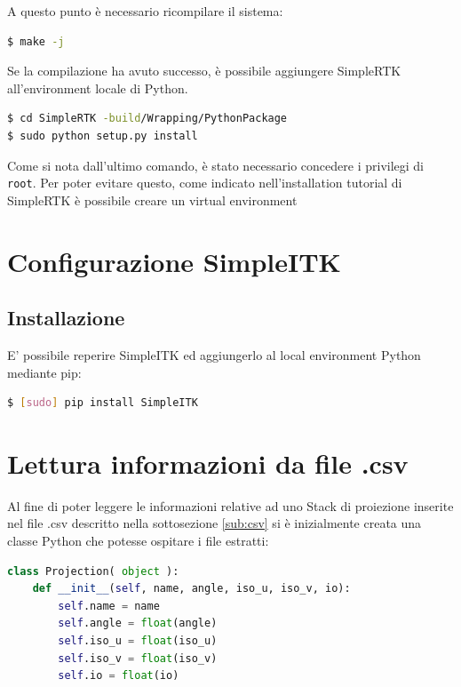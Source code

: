 \documentclass[a4paper,11pt, oneside]{article}
\begin{document}
                    A questo punto è necessario ricompilare il sistema:
                    \begin{lstlisting}[language=bash, frame=bt]
$ make -j
                    \end{lstlisting}
                    
                    Se la compilazione ha avuto successo, è possibile aggiungere SimpleRTK all'environment locale di Python.
                    \begin{lstlisting}[language=bash, frame=bt]
$ cd SimpleRTK -build/Wrapping/PythonPackage
$ sudo python setup.py install
                    \end{lstlisting}
                    Come si nota dall'ultimo comando, è stato necessario concedere i privilegi di \texttt{root}. Per poter evitare questo, come indicato nell'installation tutorial di SimpleRTK è possibile creare un virtual environment\cite{simplertk-wiki}
               
        \section{Configurazione SimpleITK}
            \subsection{Installazione}
                E' possibile reperire SimpleITK ed aggiungerlo al local environment Python mediante pip:
                \begin{lstlisting}[language=bash, frame=bt]
$ [sudo] pip install SimpleITK
                    \end{lstlisting}
            
        
        \section{Lettura informazioni da file .csv}
            Al fine di poter leggere le informazioni relative ad uno Stack di proiezione inserite nel file .csv descritto nella sottosezione \ref{sub:csv} si è inizialmente creata una classe Python che potesse ospitare i file estratti:
            
            \begin{lstlisting}[language=python, frame=bt]
class Projection( object ):
    def __init__(self, name, angle, iso_u, iso_v, io):
        self.name = name
        self.angle = float(angle)
        self.iso_u = float(iso_u)
        self.iso_v = float(iso_v)
        self.io = float(io)
            \end{lstlisting}
            
\end{document}
